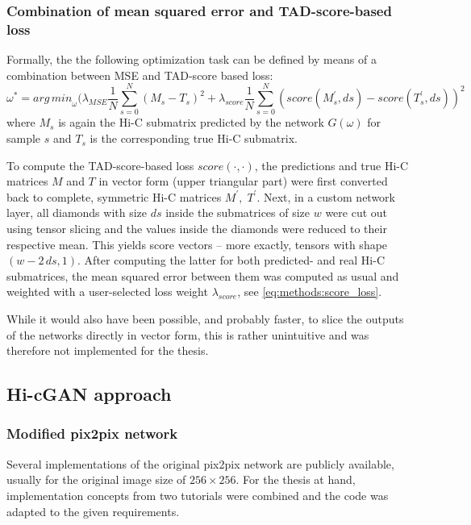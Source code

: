 \subsubsection{Combination of mean squared error and TAD-score-based loss} \label{sec:methods:score_loss}
Formally, the the following optimization task can be defined by means of a combination between MSE and TAD-score based loss:
\begin{equation}
 \omega^* = \mathit{arg\,min}_\omega (  \lambda_\mathit{MSE} \frac{1}{N} \sum_{s=0}^N (M_s - T_s)^2
                                                    + \lambda_\mathit{score} \frac{1}{N} \sum_{s=0}^N (\mathit{score}(M^\prime_s,ds) - \mathit{score}(T^\prime_s,ds))^2 \label{eq:methods:score_loss}
\end{equation}
where $M_s$ is again the Hi-C submatrix predicted by the network $G(\omega)$ for sample $s$ and $T_s$ is the corresponding true Hi-C submatrix.

To compute the TAD-score-based loss $\mathit{score}(\cdot,\cdot)$, the predictions and true Hi-C matrices $M$ and $T$ in vector form (upper triangular part)
were first converted back to complete, symmetric Hi-C matrices $M^\prime,\; T^\prime$. 
Next, in a custom network layer, all diamonds with size $ds$ inside the submatrices of size $w$ were cut out using tensor slicing and the values inside the diamonds were reduced to their respective mean.
This yields score vectors -- more exactly, tensors with shape $(w - 2\,ds, 1)$.
After computing the latter for both predicted- and real Hi-C submatrices, the mean squared error between them was computed as usual and weighted with 
a user-selected loss weight $\lambda_\mathit{score}$, see \cref{eq:methods:score_loss}.

While it would also have been possible, and probably faster, to slice the outputs of the networks directly in vector form, 
this is rather unintuitive and was therefore not implemented for the thesis. 

\subsection{Hi-cGAN approach} \label{sec:methods:hicgan}
\subsubsection{Modified pix2pix network}\label{sec:methods:cGAN_initial}
Several implementations of the original pix2pix network are publicly available, usually for the original image size of $256\times256$.
For the thesis at hand, implementation concepts from two tutorials \cite{tfpix2pix2020, brownlee2019} were combined and the code was adapted to the given requirements.


